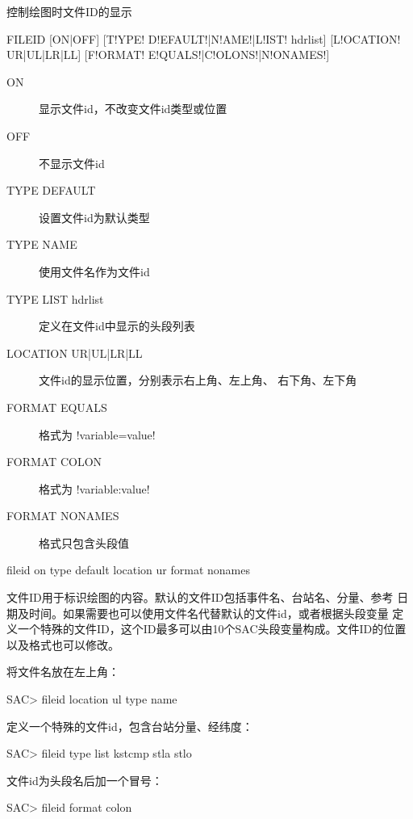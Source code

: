 \label{cmd:fileid}

控制绘图时文件ID的显示

\begin{SACSTX}
FILEID [ON|OFF] [T!YPE! D!EFAULT!|N!AME!|L!IST! hdrlist] [L!OCATION! UR|UL|LR|LL]
    [F!ORMAT! E!QUALS!|C!OLONS!|N!ONAMES!]
\end{SACSTX}

\begin{description}
\item [ON] 显示文件id，不改变文件id类型或位置
\item [OFF] 不显示文件id
\item [TYPE DEFAULT] 设置文件id为默认类型
\item [TYPE NAME] 使用文件名作为文件id
\item [TYPE LIST hdrlist] 定义在文件id中显示的头段列表
\item [LOCATION UR|UL|LR|LL] 文件id的显示位置，分别表示右上角、左上角、
    右下角、左下角
\item [FORMAT EQUALS] 格式为 !variable=value!
\item [FORMAT COLON] 格式为 !variable:value!
\item [FORMAT NONAMES] 格式只包含头段值
\end{description}

\begin{SACDFT}
fileid on type default location ur format nonames
\end{SACDFT}

文件ID用于标识绘图的内容。默认的文件ID包括事件名、台站名、分量、参考
日期及时间。如果需要也可以使用文件名代替默认的文件id，或者根据头段变量
定义一个特殊的文件ID，这个ID最多可以由10个SAC头段变量构成。文件ID的位置
以及格式也可以修改。

将文件名放在左上角：
\begin{SACCode}
SAC> fileid location ul type name
\end{SACCode}

定义一个特殊的文件id，包含台站分量、经纬度：
\begin{SACCode}
SAC> fileid type list kstcmp stla stlo
\end{SACCode}

文件id为头段名后加一个冒号：
\begin{SACCode}
SAC> fileid format colon
\end{SACCode}
